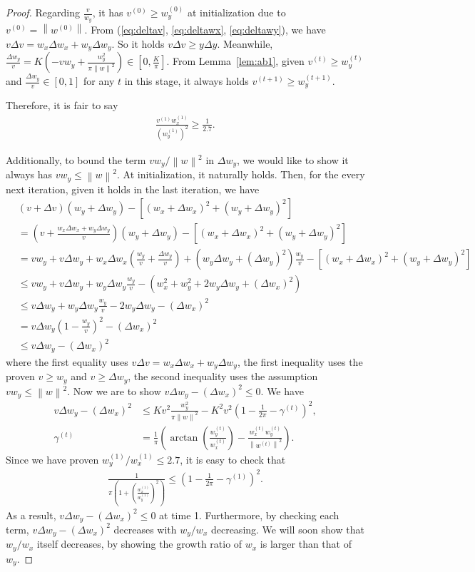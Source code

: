 \documentclass{article}
\theoremstyle{plain}
\theoremstyle{remark}
\newcommand{\norm}[1]{\left\lVert#1\right\rVert}
\newcommand{\T}[1]{^{(#1)}}
\def\t{^{(t)}}
\def\tt{^{(t+1)}}
\begin{document}
\begin{proof}
Regarding $\frac{v}{w_y}$, it has $v\T{0}\ge w_y\T{0}$ at initialization due to $v\T{0}=\norm{w\T{0}}$. From (\ref{eq:deltav}, \ref{eq:deltawx}, \ref{eq:deltawy}), we have $v\Delta v = w_x\Delta w_x + w_y \Delta w_y$. So it holds $v\Delta v\ge y\Delta y$. Meanwhile, $\frac{\Delta w_y}{v}=K(-v w_y + \frac{w_y^2}{\pi \norm{w}^2})\in [0, \frac{K}{\pi}]$. From Lemma~\ref{lem:ab1}, given $v\T{t}\ge w_y\T{t}$ and $\frac{\Delta w_y}{v}\in[0,1]$ for any $t$ in this stage, it always holds $v\tt \ge w_y\tt$.

Therefore, it is fair to say
\begin{align*}
    \frac{v\T{1}w_x\T{1}}{(w_y\T{1})^2}\ge\frac{1}{2.7}.
\end{align*}

Additionally, to bound the term $vw_y/\norm{w}^2$ in $\Delta w_y$, we would like to show it always has $v w_y\le \norm{w}^2$. At initialization, it naturally holds. Then, for the every next iteration, given it holds in the last iteration, we have
\begin{align*}
    & (v+\Delta v)(w_y+ \Delta w_y) - [(w_x + \Delta w_x)^2 + (w_y + \Delta w_y)^2] \\
    & = (v+\frac{w_x \Delta w_x + w_y \Delta w_y}{v})(w_y+\Delta w_y) - [(w_x + \Delta w_x)^2 + (w_y + \Delta w_y)^2] \\
    & = v w_y + v\Delta w_y + w_x \Delta w_x (\frac{w_y}{v} + \frac{\Delta w_y}{v}) + (w_y \Delta w_y+(\Delta w_y)^2)\frac{w_y}{v} - [(w_x + \Delta w_x)^2 + (w_y + \Delta w_y)^2]\\ 
    & \le vw_y + v\Delta w_y + w_y\Delta w_y \frac{w_y}{v} - (w_x^2 + w_y^2 + 2w_y\Delta w_y + (\Delta w_x)^2) \\
    & \le v\Delta w_y + w_y\Delta w_y \frac{w_y}{v} - 2w_y\Delta w_y - (\Delta w_x)^2 \\
    & = v\Delta w_y(1-\frac{w_y}{v})^2 - (\Delta w_x)^2 \\
    & \le v\Delta w_y - (\Delta w_x)^2
\end{align*}
where the first equality uses $v\Delta v = w_x\Delta w_x + w_y \Delta w_y$, the first inequality uses the proven $v\ge w_y$ and $v\ge \Delta w_y$, the second inequality uses the assumption $vw_y\le\norm{w}^2$. Now we are to show $v\Delta w_y - (\Delta w_x)^2\le0$. We have
\begin{align*}
    v\Delta w_y - (\Delta w_x)^2 &\le Kv^2\frac{w_y^2}{\pi\norm{w}^2} - K^2 v^2 \left(1-\frac{1}{2\pi}-\gamma\t\right)^2,\\
    \gamma\t &= \frac{1}{\pi}\left(\arctan{\left(\frac{w_y\t}{w_x\t}\right)}-\frac{w_x\t w_y\t}{\norm{w\t}^2}\right).
\end{align*}
Since we have proven $w_y\T{1}/w_x\T{1}\le2.7$, it is easy to check that 
\begin{align*}
    \frac{1}{\pi\left(1+(\frac{w_x\T{1}}{w_y\T{1}})^2\right)}\le(1-\frac{1}{2\pi}-\gamma\T{1})^2.
\end{align*}
As a result, $v\Delta w_y - (\Delta w_x)^2\le0$ at time 1. Furthermore, by checking each term, $v\Delta w_y - (\Delta w_x)^2$ decreases with $w_y/w_x$ decreasing. We will soon show that $w_y/w_x$ itself decreases, by showing the growth ratio of $w_x$ is larger than that of $w_y$.


\end{proof}
\end{document}
